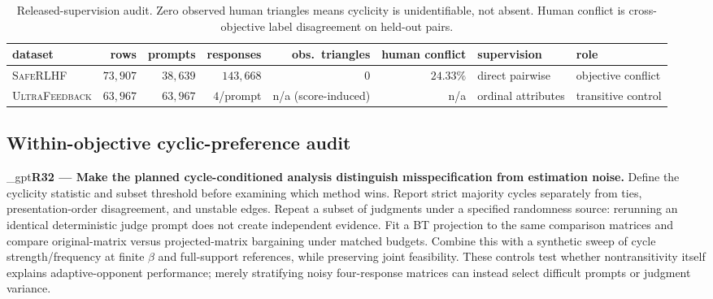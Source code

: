 \documentclass{article}
\newif\ifshowreviews
\newcommand{\reviewresponse}[1]{%
  \ifshowreviews
  \par\begingroup\color{blue!65!black}\hypersetup{allcolors=blue!65!black}\emergencystretch=2em%
  \noindent\textbf{Response:} #1\par\endgroup
  \fi}
\theoremstyle{remark}
\theoremstyle{plain}
\begin{document}
\begin{table}[t]
\centering\scriptsize
\setlength{\tabcolsep}{2.4pt}
\caption{Released-supervision audit. Zero observed human triangles means cyclicity is unidentifiable, not absent. Human conflict is cross-objective label disagreement on held-out pairs.}
\label{tab:data-audit}
\begin{tabular}{lrrrrrll}
\toprule
dataset & rows & prompts & responses & obs.\ triangles & human conflict & supervision & role\\
\midrule
\textsc{SafeRLHF} & $73{,}907$ & $38{,}639$ & $143{,}668$ & $0$ & $24.33\%$ & direct pairwise & objective conflict\\
\textsc{UltraFeedback} & $63{,}967$ & $63{,}967$ & $4$/prompt & n/a (score-induced) & n/a & ordinal attributes & transitive control\\
\bottomrule
\end{tabular}
\end{table}

\subsection{Within-objective cyclic-preference audit}
\label{app:within-rubric-audit}

\kekim_gpt{\textbf{R32 --- Make the planned cycle-conditioned analysis distinguish misspecification from estimation noise.} Define the cyclicity statistic and subset threshold before examining which method wins. Report strict majority cycles separately from ties, presentation-order disagreement, and unstable edges. Repeat a subset of judgments under a specified randomness source: rerunning an identical deterministic judge prompt does not create independent evidence. Fit a BT projection to the same comparison matrices and compare original-matrix versus projected-matrix bargaining under matched budgets. Combine this with a synthetic sweep of cycle strength/frequency at finite $\beta$ and full-support references, while preserving joint feasibility. These controls test whether nontransitivity itself explains adaptive-opponent performance; merely stratifying noisy four-response matrices can instead select difficult prompts or judgment variance.}
\reviewresponse{\textbf{R32 --- Partially addressed.} The completed $60{,}000$-judgment audit reports repeated cycles, coverage, order sensitivity, fitted BT-noise comparisons, and held-out prediction. No repeated-cycle excess is statistically resolved; no order-robust witness is eligible, so no additional confirmation judgments are collected. Original-versus-BT-projected bargaining remains pending, and the null findings are not interpreted as proof of transitivity.}
\end{document}
